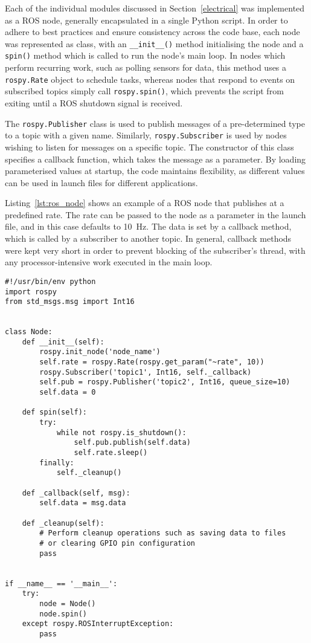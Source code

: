 Each of the individual modules discussed in Section~\ref{electrical} was
implemented as a ROS node, generally encapsulated in a single Python
script. In order to adhere to best practices and ensure consistency across
the code base, each node was represented as class, with an
\verb|__init__()| method initialising the node and a \verb|spin()| method
which is called to run the node's main loop. In nodes which perform
recurring work, such as polling sensors for data, this method uses a
\verb|rospy.Rate| object to schedule tasks, whereas nodes that respond to
events on subscribed topics simply call \verb|rospy.spin()|, which
prevents the script from exiting until a ROS shutdown signal is received.

The \verb|rospy.Publisher| class is used to publish messages of a pre-determined type to a topic with a given name. Similarly,
\verb|rospy.Subscriber| is used by nodes wishing to listen for messages on
a specific topic. The constructor of this class specifies a callback
function, which takes the message as a parameter. By loading parameterised
values at startup, the code maintains flexibility, as different values can
be used in launch files for different applications.

Listing~\ref{lst:ros_node} shows an example of a ROS node that publishes
at a predefined rate. The rate can be passed to the node as a parameter in
the launch file, and in this case defaults to \SI{10}{\Hz}. The data is
set by a callback method, which is called by a subscriber to another
topic. In general, callback methods were kept very short in order to
prevent blocking of the subscriber's thread, with any processor-intensive
work executed in the main loop.

\begin{lstlisting}[caption={Example ROS node}, label={lst:ros_node}]
#!/usr/bin/env python
import rospy
from std_msgs.msg import Int16


class Node:
    def __init__(self):
        rospy.init_node('node_name')
        self.rate = rospy.Rate(rospy.get_param("~rate", 10))
        rospy.Subscriber('topic1', Int16, self._callback)
        self.pub = rospy.Publisher('topic2', Int16, queue_size=10)
        self.data = 0

    def spin(self):
        try:
            while not rospy.is_shutdown():
                self.pub.publish(self.data)
                self.rate.sleep()
        finally:
            self._cleanup()

    def _callback(self, msg):
        self.data = msg.data

    def _cleanup(self):
        # Perform cleanup operations such as saving data to files
        # or clearing GPIO pin configuration
        pass


if __name__ == '__main__':
    try:
        node = Node()
        node.spin()
    except rospy.ROSInterruptException:
        pass
\end{lstlisting}


